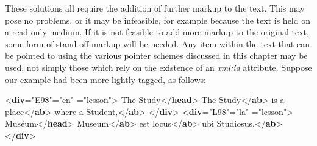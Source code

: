 These solutions all require the addition of further markup to the text. This may pose no problems, or it may be infeasible, for example because the text is held on a read-only medium. If it is not feasible to add more markup to the original text, some form of stand-off markup will be needed. Any item within the text that can be pointed to using the various pointer schemes discussed in this chapter may be used, not simply those which rely on the existence of an {\itshape xml:id} attribute. Suppose our example had been more lightly tagged, as follows: \par\bgroup{}\exampleFont \begin{shaded}\noindent\mbox{}{<\textbf{div}\hspace*{1em}{xml:id}="{E98}"\hspace*{1em}{xml:lang}="{en}"\mbox{}\newline 
\hspace*{1em}{type}="{lesson}">}\mbox{}\newline 
{}The Study{</\textbf{head}>}\mbox{}\newline 
{}The Study{</\textbf{ab}>}\mbox{}\newline 
{}is a place{</\textbf{ab}>}\mbox{}\newline 
{}where a Student,{</\textbf{ab}>}\mbox{}\newline 
{</\textbf{div}>}\mbox{}\newline 
{<\textbf{div}\hspace*{1em}{xml:id}="{L98}"\hspace*{1em}{xml:lang}="{la}"\mbox{}\newline 
\hspace*{1em}{type}="{lesson}">}\mbox{}\newline 
{}Muséum{</\textbf{head}>}\mbox{}\newline 
{}Museum{</\textbf{ab}>}\mbox{}\newline 
{}est locus{</\textbf{ab}>}\mbox{}\newline 
{}ubi Studiosus,{</\textbf{ab}>}\mbox{}\newline 
{</\textbf{div}>}\end{shaded}\egroup\par \par
